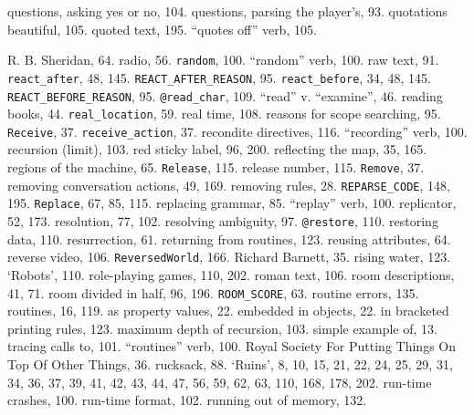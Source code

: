 {{{questions, asking yes or no, 104.
questions, parsing the player's, 93.
quotations beautiful, 105.
quoted text, 195.
``quotes off'' verb, 105.

R. B. Sheridan, 64.
radio, 56.
{{\tt random}}, 100.
``random'' verb, 100.
raw text, 91.
{{\tt react\_after}}, 48, 145.
{{\tt REACT\_AFTER\_REASON}}, 95.
{{\tt react\_before}}, 34, 48, 145.
{{\tt REACT\_BEFORE\_REASON}}, 95.
{{\tt @read\_char}}, 109.
``read'' v. ``examine'', 46.
reading books, 44.
{{\tt real\_location}}, 59.
real time, 108.
reasons for scope searching, 95.
{{\tt Receive}}, 37.
{{\tt receive\_action}}, 37.
recondite directives, 116.
``recording'' verb, 100.
recursion (limit), 103.
red sticky label, 96, 200.
reflecting the map, 35, 165.
regions of the machine, 65.
{{\tt Release}}, 115.
release number, 115.
{{\tt Remove}}, 37.
removing conversation actions, 49, 169.
removing rules, 28.
{{\tt REPARSE\_CODE}}, 148, 195.
{{\tt Replace}}, 67, 85, 115.
replacing grammar, 85.
``replay'' verb, 100.
replicator, 52, 173.
resolution, 77, 102.
resolving ambiguity, 97.
{{\tt @restore}}, 110.
restoring data, 110.
resurrection, 61.
returning from routines, 123.
reusing attributes, 64.
reverse video, 106.
{{\tt ReversedWorld}}, 166.
Richard Barnett, 35.
rising water, 123.
`Robots', 110.
role-playing games, 110, 202.
roman text, 106.
room descriptions, 41, 71.
room divided in half, 96, 196.
{{\tt ROOM\_SCORE}}, 63.
routine errors, 135.
routines, 16, 119.
\quad  as property values, 22.
\quad  embedded in objects, 22.
\quad  in bracketed printing rules, 123.
\quad  maximum depth of recursion, 103.
\quad  simple example of, 13.
\quad  tracing calls to, 101.
``routines'' verb, 100.
Royal Society For Putting Things On Top Of Other Things, 36.
rucksack, 88.
`Ruins', 8, 10, 15, 21, 22, 24, 25, 29, 31, 34, 36, 37, 39, 41, 42, 43, 44, 47, 56, 59, 62, 63, 110, 168, 178, 202.
run-time crashes, 100.
run-time format, 102.
running out of memory, 132.

}}}
